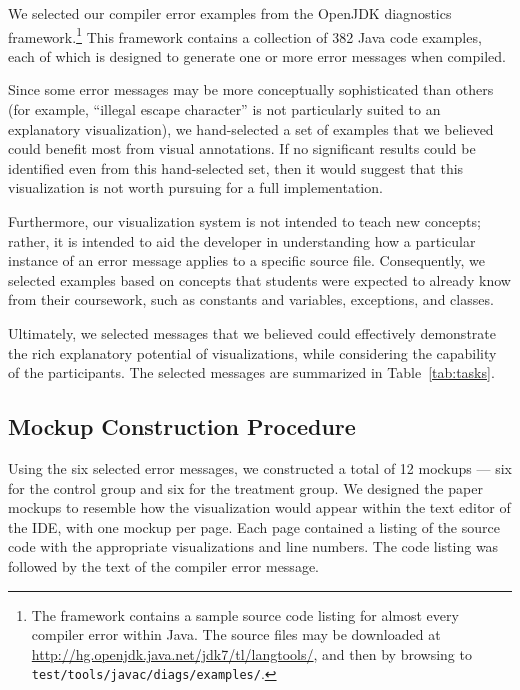 \documentclass[conference]{IEEEtran}
\begin{document}
We selected our compiler error examples from the OpenJDK diagnostics framework.\footnote{The framework contains a sample source code listing for almost every compiler error within Java. The source files may be downloaded at \url{http://hg.openjdk.java.net/jdk7/tl/langtools/}, and then by browsing to \texttt{test/tools/javac/diags/examples/}.} This framework contains a collection of 382 Java code examples, each of which is designed to generate one or more error messages when compiled.

Since some error messages may be more conceptually sophisticated than others (for example, ``illegal escape character'' is not particularly suited to an explanatory visualization), we hand-selected a set of examples that we believed could benefit most from visual annotations. If no significant results could be identified even from this hand-selected set, then it would suggest that this visualization is not worth pursuing for a full implementation.

Furthermore, our visualization system is not intended to teach new concepts; rather, it is intended to aid the developer in understanding how a particular instance of an error message applies to a specific source file. Consequently, we selected examples based on concepts that students were expected to already know from their coursework, such as constants and variables, exceptions, and classes.


Ultimately, we selected messages that we believed could effectively demonstrate the rich explanatory potential of visualizations, while considering the capability of the participants. The selected messages are summarized in Table~\ref{tab:tasks}.

\subsection{Mockup Construction Procedure}

Using the six selected error messages, we constructed a total of 12 mockups --- six for the control group and six for the treatment group. We designed the paper mockups to resemble how the visualization would appear within the text editor of the IDE, with one mockup per page. Each page contained a listing of the source code with the appropriate visualizations and line numbers. The code listing was followed by the text of the compiler error message.
\end{document}
